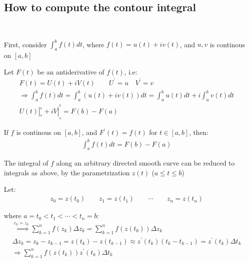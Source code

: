 \subsection{How to compute the contour integral}\hfill\\\par
\noindent First, consider $\int_{a}^{b}f(t)dt$, where $f(t) = u(t)+iv(t)$, and $u,v$ is continous on $[a,b]$
\par\bigskip
\noindent Let $F(t)$ be an antiderivative of $f(t)$, i.e:
\begin{equation*}
  \begin{gathered}
    F(t) = U(t)+iV(t)\qquad U^{\prime} = u\quad V^{\prime} = v\\
    \Rightarrow \int_{a}^{b}f(t)dt = \int_{a}^{b}(u(t)+iv(t))dt = \int_{a}^{b}u(t)dt+i\int_{a}^{b}v(t)dt\\
    U(t)|_{_a}^{^b}+iV|_{_a}^{^b} = F(b)-F(a)
  \end{gathered}
\end{equation*}
\par\bigskip
\begin{theo}[]{}
  If $f$ is continous on $[a,b]$, and $F^{\prime}(t) = f(t)$ for $t\in[a,b]$, then:
  \begin{equation*}
    \begin{gathered}
      \int_{a}^{b}f(t)dt = F(b)-F(a)
    \end{gathered}
  \end{equation*}
\end{theo}
\par\bigskip
\noindent The integral of $f$ along an arbitrary directed smooth curve can be reduced to integrals as above, by the parametrization $z(t)$ ($a\leq t\leq b$)
\par\bigskip
\noindent Let: 
\begin{equation*}
  \begin{gathered}
    z_0 = z(t_0)\qquad z_1 = z(t_1)\qquad\cdots\qquad z_n = z(t_n)
  \end{gathered}
\end{equation*}\par
\noindent where $a = t_0<t_1<\cdots<t_n = b$:
\begin{equation*}
  \begin{gathered}
    \stackrel{c_k = z_k}{\Rightarrow} \sum_{k=1}^{n}f(z_k)\Delta z_k = \sum_{k=1}^{n}f(z(t_0))\Delta z_k\\
    \Delta z_k = z_k-z_{k-1} = z(t_k) - z(t_{k-1}) \approx z^{\prime}(t_k)(t_k-t_{k-1}) = z^{\prime}(t_k)\Delta t_k\\
    \Rightarrow \sum_{k=1}^{n}f(z(t_k))z^{\prime}(t_k)\Delta t_k
  \end{gathered}
\end{equation*}\par
